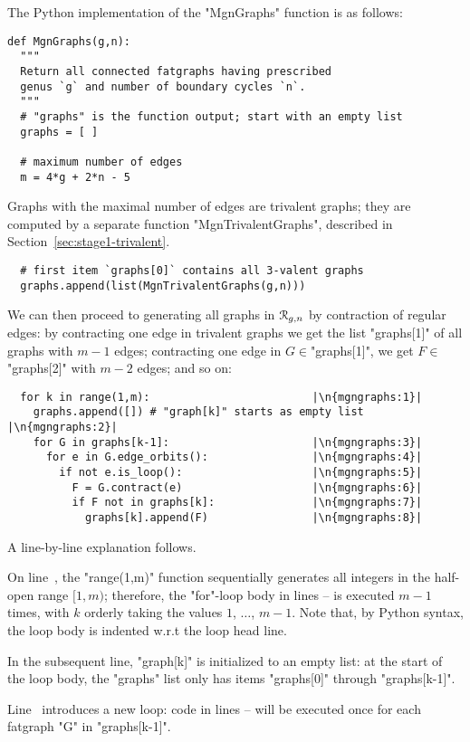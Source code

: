 The Python implementation of the "MgnGraphs" function is as follows:
\begin{lstlisting}
def MgnGraphs(g,n):
  """
  Return all connected fatgraphs having prescribed
  genus `g` and number of boundary cycles `n`.
  """
  # "graphs" is the function output; start with an empty list
  graphs = [ ]

  # maximum number of edges
  m = 4*g + 2*n - 5
\end{lstlisting}
Graphs with the maximal number of edges are trivalent graphs; they are
computed by a separate function "MgnTrivalentGraphs", described in
Section~\ref{sec:stage1-trivalent}.
\begin{lstlisting}
  # first item `graphs[0]` contains all 3-valent graphs
  graphs.append(list(MgnTrivalentGraphs(g,n)))
\end{lstlisting}
We can then proceed to generating all graphs in $\mathcal{R}_{g,n}$ by
contraction of regular edges: by contracting one edge in
trivalent graphs we get the list "graphs[1]" of all graphs with
$m-1$ edges; contracting one edge in $G \in $"graphs[1]", we
get $F \in $"graphs[2]" with $m-2$ edges; and so on:
\begin{lstlisting}
  for k in range(1,m):                         |\n{mgngraphs:1}|
    graphs.append([]) # "graph[k]" starts as empty list |\n{mgngraphs:2}|
    for G in graphs[k-1]:                      |\n{mgngraphs:3}|
      for e in G.edge_orbits():                |\n{mgngraphs:4}|
        if not e.is_loop():                    |\n{mgngraphs:5}|
          F = G.contract(e)                    |\n{mgngraphs:6}|
          if F not in graphs[k]:               |\n{mgngraphs:7}|
            graphs[k].append(F)                |\n{mgngraphs:8}|
\end{lstlisting}
A line-by-line explanation follows.

On line~, the "range(1,m)" function sequentially
generates all integers in the half-open range $[1, m)$; therefore, the
"for"-loop body in lines -- is
executed $m-1$ times, with $k$ orderly taking the values $1$, $\ldots$,
$m-1$.  Note that, by Python syntax, the loop body is indented w.r.t
the loop head line.

In the subsequent line, "graph[k]" is initialized to an empty list: at
the start of the loop body, the "graphs" list only has items
"graphs[0]" through "graphs[k-1]".

Line~ introduces a new loop: code in lines
-- will be executed once for each
fatgraph "G" in "graphs[k-1]".

